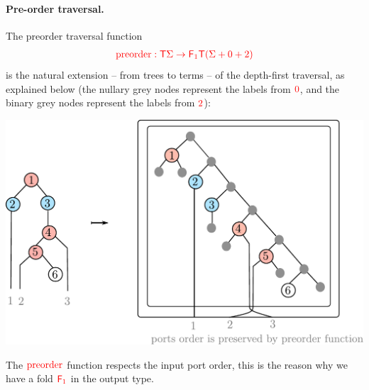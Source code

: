         \paragraph*{Pre-order traversal.} The preorder traversal function  
        \begin{align*}
            {\color{red}{{\color{red}{\mathrm{preorder}}}: {\color{red}{\mathsf T}}\Sigma \to {\color{red}{\mathsf F_{1}}}{\color{red}{\mathsf T}}({\color{red}{\Sigma}}+ 0 + 2)}}
        \end{align*}
        is the natural extension -- from trees to terms -- of the depth-first traversal, as explained below (the nullary grey nodes represent the labels from ${\color{red}{0}}$, and the binary grey nodes represent the labels from ${\color{red}{2}}$):
        \begin{center}
        \includegraphics[scale=.34]{preorder.pdf}
        \end{center}
The ${\color{red}{\mathrm{preorder}}}$ function respects the input port order, this is the reason  why we have a fold $\reduce 1$ in the output type. 




